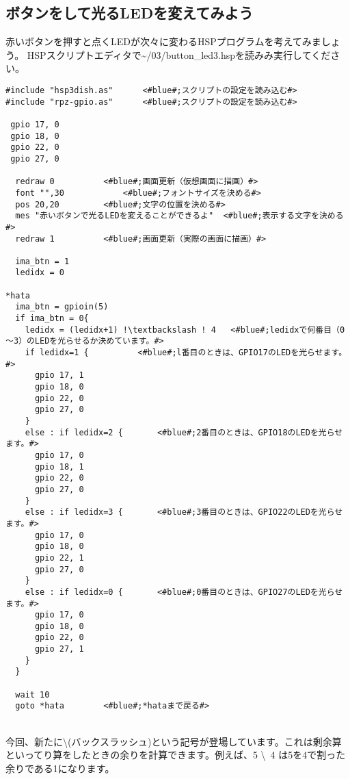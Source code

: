 \subsection{ボタンをして光るLEDを変えてみよう}
赤いボタンを押すと点くLEDが次々に変わるHSPプログラムを考えてみましょう。
HSPスクリプトエディタで\textasciitilde /03/button\_led3.hspを読みみ実行してください。

\begin{lstlisting}[escapechar=!,caption=button\_led3.hsp,label=button_led3.hsp]
#include "hsp3dish.as"		<#blue#;スクリプトの設定を読み込む#>
#include "rpz-gpio.as"		<#blue#;スクリプトの設定を読み込む#>

 gpio 17, 0
 gpio 18, 0
 gpio 22, 0
 gpio 27, 0
	
  redraw 0			<#blue#;画面更新（仮想画面に描画）#>
  font "",30			<#blue#;フォントサイズを決める#>
  pos 20,20			<#blue#;文字の位置を決める#>
  mes "赤いボタンで光るLEDを変えることができるよ"	<#blue#;表示する文字を決める#>
  redraw 1			<#blue#;画面更新（実際の画面に描画）#>

  ima_btn = 1
  ledidx = 0

*hata
  ima_btn = gpioin(5)
  if ima_btn = 0{
    ledidx = (ledidx+1) !\textbackslash ! 4	  <#blue#;ledidxで何番目（0～3）のLEDを光らせるか決めています。#>
    if ledidx=1 {		   <#blue#;l番目のときは、GPIO17のLEDを光らせます。#>
      gpio 17, 1
      gpio 18, 0
      gpio 22, 0
      gpio 27, 0
    }
    else : if ledidx=2 {	   <#blue#;2番目のときは、GPIO18のLEDを光らせます。#>
      gpio 17, 0
      gpio 18, 1
      gpio 22, 0
      gpio 27, 0
    }
    else : if ledidx=3 {	   <#blue#;3番目のときは、GPIO22のLEDを光らせます。#>
      gpio 17, 0
      gpio 18, 0
      gpio 22, 1
      gpio 27, 0
    }
    else : if ledidx=0 {	   <#blue#;0番目のときは、GPIO27のLEDを光らせます。#>
      gpio 17, 0
      gpio 18, 0
      gpio 22, 0
      gpio 27, 1
    }
  }

  wait 10
  goto *hata		<#blue#;*hataまで戻る#>
\end{lstlisting}

\noindent \textbf{}\\
今回、新たに\textbackslash (バックスラッシュ)という記号が登場しています。これは剰余算といってり算をしたときの余りを計算できます。例えば、5 \textbackslash \ 4 は5を4で割った余りである1になります。


